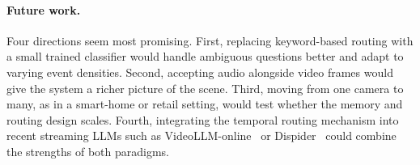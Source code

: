 \paragraph{Future work.}
Four directions seem most promising. First, replacing keyword-based routing with a small trained classifier would handle ambiguous questions better and adapt to varying event densities. Second, accepting audio alongside video frames would give the system a richer picture of the scene. Third, moving from one camera to many, as in a smart-home or retail setting, would test whether the memory and routing design scales. Fourth, integrating the temporal routing mechanism into recent streaming LLMs such as VideoLLM-online~\cite{chen2024videollmonline} or Dispider~\cite{he2024dispider} could combine the strengths of both paradigms.
